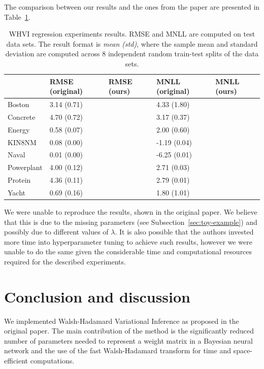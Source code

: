 \documentclass[11pt, twocolumn]{article}
\begin{document}
    The comparison between our results and the ones from the paper are presented in Table~\ref{tab:regression-experiments}.
    \begin{table}[]
        \begin{tabular}{l|llll}
                   & RMSE (original) & RMSE (ours) & { }MNLL (original) & MNLL (ours) \\ \hline
        Boston     & 3.14 (0.71)     &             & { }4.33 (1.80)     &             \\
        Concrete   & 4.70 (0.72)     &             & { }3.17 (0.37)     &             \\
        Energy     & 0.58 (0.07)     &             & { }2.00 (0.60)     &             \\
        KIN8NM     & 0.08 (0.00)     &             & -1.19 (0.04)       &             \\
        Naval      & 0.01 (0.00)     &             & -6.25 (0.01)       &             \\
        Powerplant & 4.00 (0.12)     &             & { }2.71 (0.03)     &             \\
        Protein    & 4.36 (0.11)     &             & { }2.79 (0.01)     &             \\
        Yacht      & 0.69 (0.16)     &             & { }1.80 (1.01)     &
        \end{tabular}
        \caption{WHVI regression experiments results. RMSE and MNLL are computed on test data sets. The result format is \textit{mean (std)}, where the sample mean and standard deviation are computed across 8 independent random train-test splits of the data sets.}
        \label{tab:regression-experiments}
    \end{table}
    We were unable to reproduce the results, shown in the original paper.
    We believe that this is due to the missing parameters (see Subsection~\ref{sec:toy-example}) and possibly due to different values of $\lambda$.
    It is also possible that the authors invested more time into hyperparameter tuning to achieve such results, however we were unable to do the same given the considerable time and computational resources required for the described experiments.


    \section{Conclusion and discussion}\label{sec:conclusion-and-discussion}
    We implemented Walsh-Hadamard Variational Inference as proposed in the original paper.
    The main contribution of the method is the significantly reduced number of parameters needed to represent a weight matrix in a Bayesian neural network and the use of the fast Walsh-Hadamard transform for time and space-efficient computations.
\end{document}

